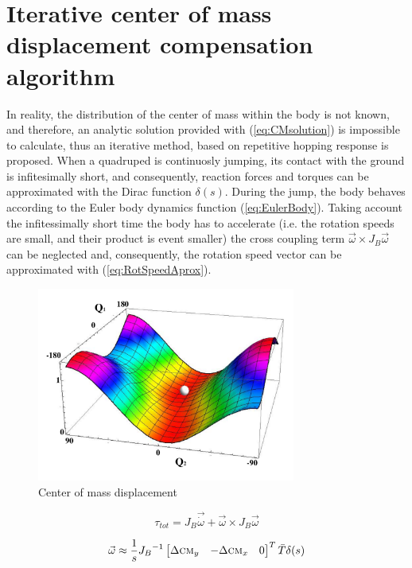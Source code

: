 \section{Iterative center of mass displacement compensation algorithm}
In reality, the distribution of the center of mass within the body is not known, and therefore, an analytic solution provided with (\ref{eq:CMsolution}) is impossible to calculate, thus an iterative method, based on repetitive hopping response is proposed. When a quadruped is continuosly jumping, its contact with the ground is infitesimally short, and consequently, reaction forces and torques can be approximated with the Dirac function $\delta (s)$. During the jump, the body behaves according to the Euler body dynamics function (\ref{eq:EulerBody}). Taking account the infitessimally short time the body has to accelerate (i.e. the rotation speeds are small, and their product is event smaller) the cross coupling term $\vec{\omega}\times J_B\vec{\omega}$ can be neglected and, consequently, the rotation speed vector can be approximated with (\ref{eq:RotSpeedAprox}).
\begin{figure}
	\centering
	\includegraphics[width=85mm]{./pictures/RobinRepicCM.pdf}
	\caption{Center of mass displacement}
	\label{fig:CM3Dfunction}
\end{figure}

\begin{equation}\label{eq:EulerBody}
\tau_{tot}=J_B\vec{\dot{\omega}}+\vec{\omega}\times J_B\vec{\omega}
\end{equation}

\begin{equation}\label{eq:RotSpeedAprox}
\vec{\omega}\approx \frac{1}{s}{J_B}^{-1}\begin{bmatrix}
\Delta \textsc{cm}_y & -\Delta \textsc{cm}_x & 0
\end{bmatrix}^T\bar{T}\delta(s)
\end{equation}

